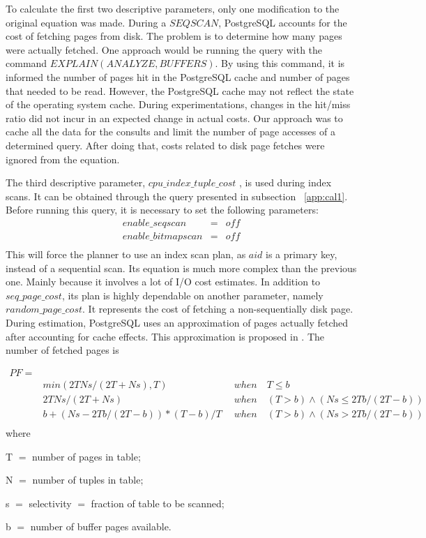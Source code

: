 \documentclass[jidm,a4paper]{jidm} %
\begin{document}
To calculate the first two descriptive parameters, only one modification to the original equation was made. During a $SEQSCAN$, PostgreSQL accounts for the cost of fetching pages from disk. The problem is to determine how many pages were actually fetched. One approach would be running the query with the command $EXPLAIN (ANALYZE,BUFFERS)$. By using this command, it is informed the number of pages hit in the PostgreSQL cache and number of pages that needed to be read. However, the PostgreSQL cache may not reflect the state of the operating system cache. During experimentations, changes in the hit/miss ratio did not incur in an expected change in actual costs. Our approach was to cache all the data for the consults and limit the number of page accesses of a determined query. After doing that, costs related to disk page fetches were ignored from the equation.

The third descriptive parameter, $cpu\_index\_tuple\_cost$ , is used during index scans. It can be obtained through the query presented in subsection ~\ref{app:cal1}. Before running this query, it is necessary to set the following parameters:
\begin{eqnarray*}
 enable\_seqscan&=&off \\
 enable\_bitmapscan&=&off \\
\end{eqnarray*}
This will force the planner to use an index scan plan, as $aid$ is a primary key, instead of a sequential scan. Its equation is much more complex than the previous one. Mainly because it involves a lot of I/O cost estimates. In addition to $seq\_page\_cost$, its plan is highly dependable on another parameter, namely $random\_page\_cost$. It represents the cost of fetching a non-sequentially disk page. During estimation, PostgreSQL uses an approximation of pages actually fetched after accounting for cache effects. This approximation is proposed in \cite{Mackert:1989:ISU:68012.68016}. The number of fetched pages is

\begin{eqnarray*}
  PF=&& \\
  &min(2TNs/(2T+Ns),T)\qquad \qquad \qquad & when\quad T \le b \\
  &2TNs/(2T+Ns) & when \quad (T > b) \wedge (Ns \le 2Tb/(2T-b)) \\
  &b + (Ns -2Tb/(2T-b))*(T-b)/T & when \quad (T > b) \wedge (Ns > 2Tb/(2T-b)) \\
\end{eqnarray*}
where
\begin{description}
 \item T $=$ number of pages in table;
 \item N $=$ number of tuples in table;
 \item s $=$ selectivity $=$ fraction of table to be scanned;
 \item b $=$ number of buffer pages available.
\end{description}
\end{document}
